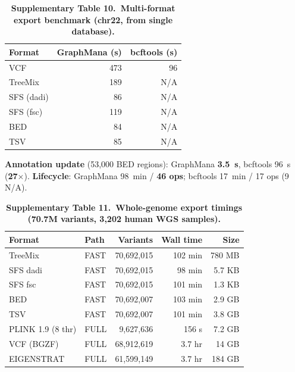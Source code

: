 \documentclass[11pt,a4paper]{article}
\begin{document}
\clearpage

\begin{table}[p]
\centering
\caption*{\textbf{Supplementary Table 10.~Multi-format export benchmark (chr22, from single database).}}
\vspace{0.5em}
\begin{tabular}{@{}lrr@{}}
\toprule
Format & GraphMana (s) & bcftools (s) \\
\midrule
VCF & 473 & 96 \\
TreeMix & 189 & N/A \\
SFS (dadi) & 86 & N/A \\
SFS (fsc) & 119 & N/A \\
BED & 84 & N/A \\
TSV & 85 & N/A \\
\bottomrule
\end{tabular}

\vspace{0.5em}
\noindent\footnotesize\textbf{Annotation update} (53,000 BED regions): GraphMana \textbf{3.5~s}, bcftools 96~s (\textbf{27$\times$}). \textbf{Lifecycle}: GraphMana 98~min / \textbf{46 ops}; bcftools 17~min / 17 ops (9 N/A).
\end{table}

\clearpage

\begin{table}[p]
\centering
\caption*{\textbf{Supplementary Table 11.~Whole-genome export timings (70.7M variants, 3,202 human WGS samples).}}
\vspace{0.5em}
\begin{tabular}{@{}llrrr@{}}
\toprule
Format & Path & Variants & Wall time & Size \\
\midrule
TreeMix & FAST & 70,692,015 & 102 min & 780 MB \\
SFS dadi & FAST & 70,692,015 & 98 min & 5.7 KB \\
SFS fsc & FAST & 70,692,015 & 101 min & 1.3 KB \\
BED & FAST & 70,692,007 & 103 min & 2.9 GB \\
TSV & FAST & 70,692,007 & 101 min & 3.8 GB \\
PLINK 1.9 (8 thr) & FULL & 9,627,636 & 156 s & 7.2 GB \\
VCF (BGZF) & FULL & 68,912,619 & 3.7 hr & 14 GB \\
EIGENSTRAT & FULL & 61,599,149 & 3.7 hr & 184 GB \\
\bottomrule
\end{tabular}
\end{table}

\clearpage
\end{document}
